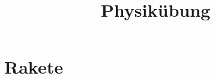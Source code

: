 \documentclass[a4,12pt]{scrartcl}
\begin{document}
\title{Physikübung}
\maketitle

\section{Rakete}
\end{document}
